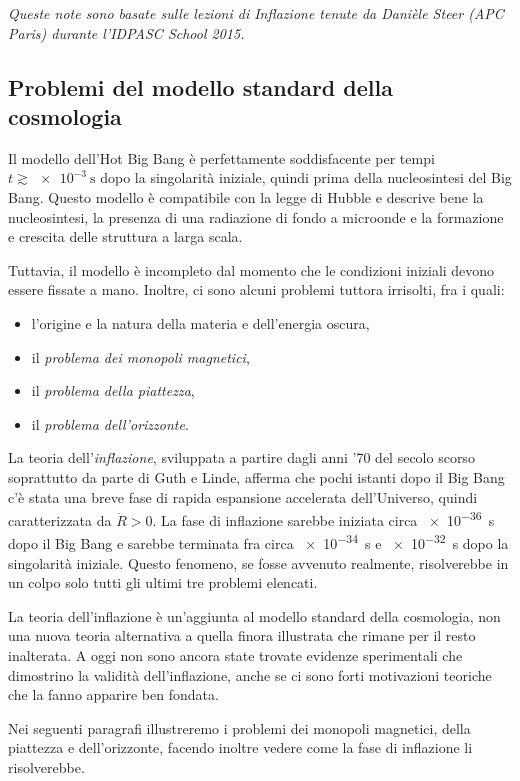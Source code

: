 \emph{Queste note sono basate sulle lezioni di Inflazione tenute da Danièle
  Steer (APC Paris) durante l'IDPASC School 2015.}

\subsection{Problemi del modello standard della cosmologia}
\label{sec:problemi-cosmologia}

Il modello dell'Hot Big Bang è perfettamente soddisfacente per tempi \(t\gtrsim
\SI{e-3}{\second}\) dopo la singolarità iniziale, quindi prima della
nucleosintesi del Big Bang.  Questo modello è compatibile con la legge di Hubble
e descrive bene la nucleosintesi, la presenza di una radiazione di fondo a
microonde e la formazione e crescita delle struttura a larga scala.

Tuttavia, il modello è incompleto dal momento che le condizioni iniziali devono
essere fissate a mano.  Inoltre, ci sono alcuni problemi tuttora irrisolti, fra
i quali:
\begin{itemize}
\item l'origine e la natura della materia e dell'energia oscura,
\item il \emph{problema dei monopoli magnetici},
\item il \emph{problema della piattezza},
\item il \emph{problema dell'orizzonte}.
\end{itemize}
La teoria dell'\emph{inflazione}, sviluppata a partire dagli anni '70 del secolo
scorso soprattutto da parte di Guth e Linde, afferma che pochi istanti dopo il
Big Bang c'è stata una breve fase di rapida espansione accelerata dell'Universo,
quindi caratterizzata da \(\ddot{R}>0\).  La fase di inflazione sarebbe iniziata
circa \SI{e-36}{\second} dopo il Big Bang e sarebbe terminata fra circa
\SI{e-34}{\second} e \SI{e-32}{\second} dopo la singolarità iniziale.  Questo
fenomeno, se fosse avvenuto realmente, risolverebbe in un colpo solo tutti gli
ultimi tre problemi elencati.

La teoria dell'inflazione è un'aggiunta al modello standard della cosmologia,
non una nuova teoria alternativa a quella finora illustrata che rimane per il
resto inalterata.  A oggi non sono ancora state trovate evidenze sperimentali
che dimostrino la validità dell'inflazione, anche se ci sono forti motivazioni
teoriche che la fanno apparire ben fondata.

Nei seguenti paragrafi illustreremo i problemi dei monopoli magnetici, della
piattezza e dell'orizzonte, facendo inoltre vedere come la fase di inflazione li
risolverebbe.

